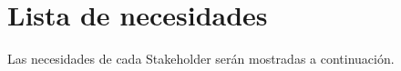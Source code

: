 \chapter{Lista de necesidades}
Las necesidades de cada Stakeholder serán mostradas a continuación. 

